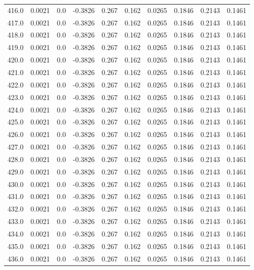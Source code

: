 \begin{longtable}{lrrrrrrrrr}
416.0 & 0.0021 & 0.0 & -0.3826 & 0.267 & 0.162 & 0.0265 & 0.1846 & 0.2143 & 0.1461 \\
417.0 & 0.0021 & 0.0 & -0.3826 & 0.267 & 0.162 & 0.0265 & 0.1846 & 0.2143 & 0.1461 \\
418.0 & 0.0021 & 0.0 & -0.3826 & 0.267 & 0.162 & 0.0265 & 0.1846 & 0.2143 & 0.1461 \\
419.0 & 0.0021 & 0.0 & -0.3826 & 0.267 & 0.162 & 0.0265 & 0.1846 & 0.2143 & 0.1461 \\
420.0 & 0.0021 & 0.0 & -0.3826 & 0.267 & 0.162 & 0.0265 & 0.1846 & 0.2143 & 0.1461 \\
421.0 & 0.0021 & 0.0 & -0.3826 & 0.267 & 0.162 & 0.0265 & 0.1846 & 0.2143 & 0.1461 \\
422.0 & 0.0021 & 0.0 & -0.3826 & 0.267 & 0.162 & 0.0265 & 0.1846 & 0.2143 & 0.1461 \\
423.0 & 0.0021 & 0.0 & -0.3826 & 0.267 & 0.162 & 0.0265 & 0.1846 & 0.2143 & 0.1461 \\
424.0 & 0.0021 & 0.0 & -0.3826 & 0.267 & 0.162 & 0.0265 & 0.1846 & 0.2143 & 0.1461 \\
425.0 & 0.0021 & 0.0 & -0.3826 & 0.267 & 0.162 & 0.0265 & 0.1846 & 0.2143 & 0.1461 \\
426.0 & 0.0021 & 0.0 & -0.3826 & 0.267 & 0.162 & 0.0265 & 0.1846 & 0.2143 & 0.1461 \\
427.0 & 0.0021 & 0.0 & -0.3826 & 0.267 & 0.162 & 0.0265 & 0.1846 & 0.2143 & 0.1461 \\
428.0 & 0.0021 & 0.0 & -0.3826 & 0.267 & 0.162 & 0.0265 & 0.1846 & 0.2143 & 0.1461 \\
429.0 & 0.0021 & 0.0 & -0.3826 & 0.267 & 0.162 & 0.0265 & 0.1846 & 0.2143 & 0.1461 \\
430.0 & 0.0021 & 0.0 & -0.3826 & 0.267 & 0.162 & 0.0265 & 0.1846 & 0.2143 & 0.1461 \\
431.0 & 0.0021 & 0.0 & -0.3826 & 0.267 & 0.162 & 0.0265 & 0.1846 & 0.2143 & 0.1461 \\
432.0 & 0.0021 & 0.0 & -0.3826 & 0.267 & 0.162 & 0.0265 & 0.1846 & 0.2143 & 0.1461 \\
433.0 & 0.0021 & 0.0 & -0.3826 & 0.267 & 0.162 & 0.0265 & 0.1846 & 0.2143 & 0.1461 \\
434.0 & 0.0021 & 0.0 & -0.3826 & 0.267 & 0.162 & 0.0265 & 0.1846 & 0.2143 & 0.1461 \\
435.0 & 0.0021 & 0.0 & -0.3826 & 0.267 & 0.162 & 0.0265 & 0.1846 & 0.2143 & 0.1461 \\
436.0 & 0.0021 & 0.0 & -0.3826 & 0.267 & 0.162 & 0.0265 & 0.1846 & 0.2143 & 0.1461 \\

\end{longtable}
